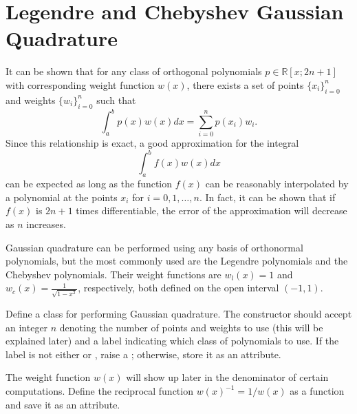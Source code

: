 \label{Lab:GaussQuad}



\section*{Legendre and Chebyshev Gaussian Quadrature} %

It can be shown that for any class of orthogonal polynomials $p\in \mathbb{R}[x;2n+1]$ with corresponding weight function $w(x)$, there exists a set of points $\{x_i\}_{i=0}^n$ and weights $\{w_i\}_{i=0}^n$ such that
\[
\int_a^b p(x) w(x) dx = \sum_{i=0}^n p(x_i)w_i.
\]
Since this relationship is exact, a good approximation for the integral
\[
\int_a^b f(x) w(x) dx
\]
can be expected as long as the function $f(x)$ can be reasonably interpolated by a polynomial at the points $x_i$ for $i=0,1,\dots,n$.
In fact, it can be shown that if $f(x)$ is $2n+1$ times differentiable, the error of the approximation will decrease as $n$ increases.

Gaussian quadrature can be performed using any basis of orthonormal polynomials, but the most commonly used are the Legendre polynomials and the Chebyshev polynomials.
Their weight functions are $w_l(x)=1$ and $w_c(x)=\frac{1}{\sqrt{1-x^2}}$, respectively, both defined on the open interval $(-1,1)$.

\begin{problem} %
\label{prob:gaussquad-init}
Define a class for performing Gaussian quadrature.
The constructor should accept an integer $n$ denoting the number of points and weights to use (this will be explained later) and a label indicating which class of polynomials to use.
If the label is not either  or , raise a ; otherwise, store it as an attribute.

The weight function $w(x)$ will show up later in the denominator of certain computations.
Define the reciprocal function $w(x)^{-1} = 1/w(x)$ as a  function and save it as an attribute.
\end{problem}

